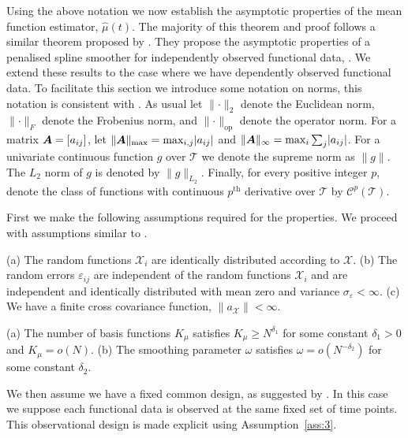 Using the above notation we now establish the asymptotic properties of the mean function estimator, $\hat{\mu}(t)$. 
The majority of this theorem and proof follows a similar theorem proposed by \citeauthor{xiao_asymptotic_2020}.
They propose the asymptotic properties of a penalised spline smoother for independently observed functional data, \citep{xiao_asymptotic_2020}.
We extend these results to the case where we have dependently observed functional data.
To facilitate this section we introduce some notation on norms, this notation is consistent with \citep{xiao_asymptotic_2020}. 
As usual let $\lVert \cdot \rVert_2$ denote the Euclidean norm, $\lVert \cdot \rVert_{F}$ denote the Frobenius norm, and $\lVert \cdot \rVert_\text{op}$ denote the operator norm.
For a matrix $\bm{{A}} = \left[a_{ij}\right]$, let $\lVert \bm{{A}} \rVert_\text{max} = \max_{i,j} \lvert a_{ij} \rvert$ and $\lVert \bm{{A}} \rVert_\infty = \max_i \sum_j \lvert a_{ij} \rvert$.
For a univariate continuous function $g$ over $\mathcal{T}$ we denote the supreme norm as $\lVert g \rVert$.
The $L_2$ norm of $g$ is denoted by $\lVert g \rVert_{L_2}$.
Finally, for every positive integer $p$, denote the class of functions with continuous $p^\text{th}$ derivative over $\mathcal{T}$ by $\mathcal{C}^p(\mathcal{T})$.

First we make the following assumptions required for the properties. 
We proceed with assumptions similar to \citep{xiao_asymptotic_2020}. 
\begin{assumption}
	(a) The random functions $\mathcal{X}_i$ are identically distributed according to $\mathcal{X}$. (b) The random errors $\varepsilon_{ij}$ are independent of the random functions $\mathcal{X}_i$ and are independent and identically distributed with mean zero and variance $\sigma_\varepsilon < \infty$. (c) We have a finite cross covariance function, $\lVert a_\mathcal{X}\rVert < \infty$. 
	\label{ass:1}
\end{assumption}

\begin{assumption}
	(a) The number of basis functions $K_\mu$ satisfies $K_\mu \geq N^{\delta_1}$ for some constant $\delta_1 > 0$ and $K_\mu = o(N)$. (b) The smoothing parameter  $\omega$ satisfies $\omega = o(N^{-\delta_2})$ for some constant $\delta_2$. 
	\label{ass:2}
\end{assumption}

We then assume we have a fixed common design, as suggested by \citep{xiao_asymptotic_2020}. In this case we suppose each functional data is observed at the same fixed set of time points. This observational design is made explicit using Assumption~\ref{ass:3}. 

